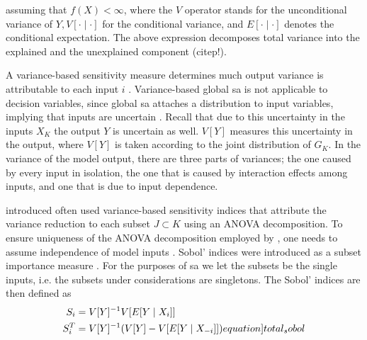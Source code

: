 \noindent assuming that $f(X) < \infty$, where the $V$ operator stands for the unconditional variance of $Y, V[\cdot \mid \cdot]$ for the conditional variance, and $E[\cdot \mid \cdot]$ denotes the conditional expectation. The above expression decomposes total variance into the explained and the unexplained component (citep!).

A variance-based sensitivity measure determines much output variance is attributable to each input $i$ \citep{BP16}. Variance-based global sa is not applicable to decision variables, since global sa attaches a distribution to input variables, implying that inputs are uncertain \citep{SNS16}. Recall that due to this uncertainty in the inputs $X_K$ the output $Y$ is uncertain as well. $V[Y]$ measures this uncertainty in the output, where $V[Y]$ is taken according to the joint distribution of $G_K$. In the variance of the model output, there are three parts of variances; the one caused by every input in isolation, the one that is caused by interaction effects among inputs, and one that is due to input dependence.

\citet{S93} introduced often used variance-based sensitivity indices that attribute the variance reduction to each subset $J \subset K$ using an ANOVA decomposition. To ensure uniqueness of the ANOVA decomposition employed by \citet{S53}, one needs to assume independence of model inputs \citep{GM17}. Sobol' indices were introduced as a subset importance measure \citep{SNS16}. For the purposes of sa we let the subsets be the single inputs, i.e. the subsets under considerations are singletons. The Sobol' indices are then defined as
\begin{align}
S_i &= V[Y]^{-1} V[E[Y \mid X_i]]\\
S_i^T &= V[Y]^{-1}(V[Y] - V[E[Y \mid {X_{- i}}]])
\label[equation]{total_sobol}
\end{align}

